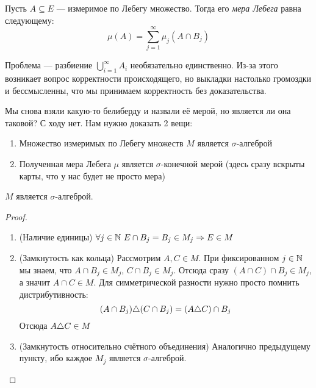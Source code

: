 \begin{definition}
	Пусть $A \subseteq E$ --- измеримое по Лебегу множество. Тогда его \textit{мера Лебега} равна следующему:
	\[
		\mu(A) = \sum_{j = 1}^\infty \mu_j(A \cap B_j)
	\]
\end{definition}

\begin{note}
	Проблема --- разбиение $\bigcup_{i = 1}^\infty A_i$ необязательно единственно. Из-за этого возникает вопрос корректности происходящего, но выкладки настолько громоздки и бессмысленны, что мы принимаем корректность без доказательства.
\end{note}

\begin{note}
	Мы снова взяли какую-то белиберду и назвали её мерой, но является ли она таковой? С ходу нет. Нам нужно доказать 2 вещи:
	\begin{enumerate}
		\item Множество измеримых по Лебегу множеств $M$ является $\sigma$-алгеброй
		
		\item Полученная мера Лебега $\mu$ является $\sigma$-конечной мерой (здесь сразу вскрыты карты, что у нас будет не просто мера)
	\end{enumerate}
\end{note}

\begin{theorem}
	$M$ является $\sigma$-алгеброй.
\end{theorem}

\begin{proof}~
	\begin{enumerate}
		\item (Наличие единицы) $\forall j \in \mathbb{N}\ E \cap B_j = B_j \in M_j \Rightarrow E \in M$
		
		\item (Замкнутость как кольца) Рассмотрим $A, C \in M$. При фиксированном $j \in \mathbb{N}$ мы знаем, что $A \cap B_j \in M_j$, $C \cap B_j \in M_j$. Отсюда сразу $(A \cap C) \cap B_j \in M_j$, а значит $A \cap C \in M$. Для симметрической разности нужно просто помнить дистрибутивность:
		\[
			(A \cap B_j) \triangle (C \cap B_j) = (A \triangle C) \cap B_j
		\]
		Отсюда $A \triangle C \in M$
		
		\item (Замкнутость относительно счётного объединения) Аналогично предыдущему пункту, ибо каждое $M_j$ является $\sigma$-алгеброй.
	\end{enumerate}
\end{proof}

